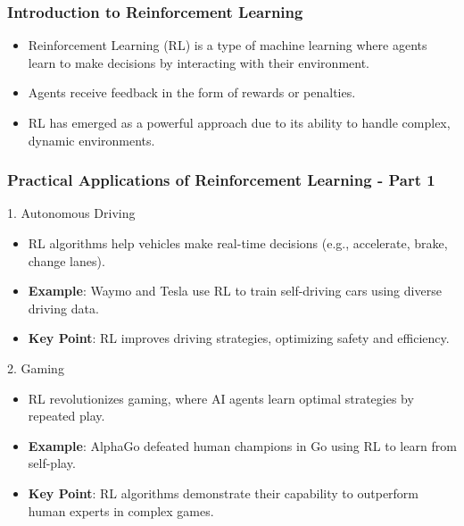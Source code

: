 \documentclass[aspectratio=169]{beamer}
\begin{document}
\begin{frame}[fragile]
    \frametitle{Introduction to Reinforcement Learning}
    \begin{itemize}
        \item Reinforcement Learning (RL) is a type of machine learning where agents learn to make decisions by interacting with their environment.
        \item Agents receive feedback in the form of rewards or penalties.
        \item RL has emerged as a powerful approach due to its ability to handle complex, dynamic environments.
    \end{itemize}
\end{frame}

\begin{frame}[fragile]
    \frametitle{Practical Applications of Reinforcement Learning - Part 1}
    \begin{block}{1. Autonomous Driving}
        \begin{itemize}
            \item RL algorithms help vehicles make real-time decisions (e.g., accelerate, brake, change lanes).
            \item \textbf{Example}: Waymo and Tesla use RL to train self-driving cars using diverse driving data.
            \item \textbf{Key Point}: RL improves driving strategies, optimizing safety and efficiency.
        \end{itemize}
    \end{block}
    
    \begin{block}{2. Gaming}
        \begin{itemize}
            \item RL revolutionizes gaming, where AI agents learn optimal strategies by repeated play.
            \item \textbf{Example}: AlphaGo defeated human champions in Go using RL to learn from self-play.
            \item \textbf{Key Point}: RL algorithms demonstrate their capability to outperform human experts in complex games.
        \end{itemize}
    \end{block}
\end{frame}
\end{document}
